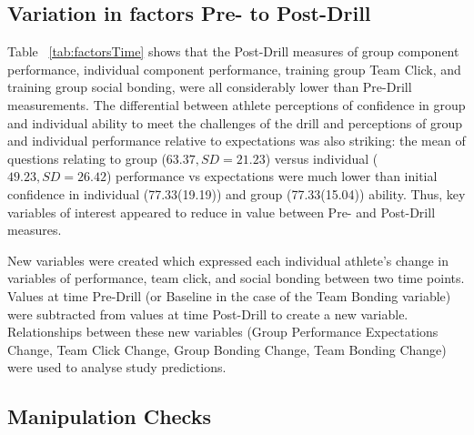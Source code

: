 \subsection{Variation in factors Pre- to Post-Drill}


Table ~\ref{tab:factorsTime} shows that the Post-Drill measures of group component performance, individual component performance, training group Team Click, and training group social bonding, were all considerably lower than Pre-Drill measurements. The differential between athlete perceptions of confidence in group and individual ability to meet the challenges of the drill and perceptions of group and individual performance relative to expectations was also striking: the mean of questions relating to group ($63.37, SD = 21.23$) versus individual ($49.23, SD = 26.42$) performance vs expectations were much lower than initial confidence in individual (77.33(19.19)) and group (77.33(15.04)) ability.  Thus, key variables of interest appeared to reduce in value between Pre- and Post-Drill measures.



New variables were created which expressed each individual athlete's change in variables of performance, team click, and social bonding between two time points.  Values at time Pre-Drill (or Baseline in the case of the Team Bonding variable) were subtracted from values at time Post-Drill to create a new variable.  Relationships between these new variables (Group Performance Expectations Change, Team Click Change, Group Bonding Change, Team Bonding Change) were used to analyse study predictions.





\subsection{Manipulation Checks}

